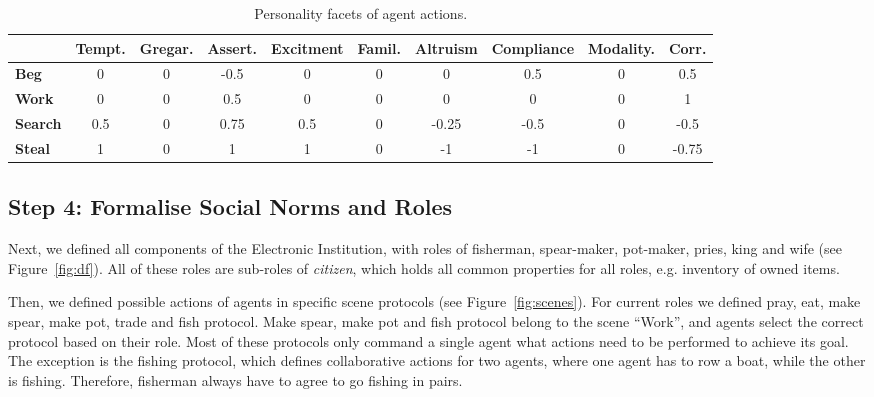 \begin{table}
\caption{Personality facets of agent actions.}
\begin{tabular}{|l|c|c|c|c|c|c|c|c|c|}
\hline

  & \textbf{Tempt.} & \textbf{Gregar.} & \textbf{Assert.} & \textbf{Excitment} & \textbf{Famil.} & \textbf{Altruism} & \textbf{Compliance} & \textbf{Modality.} & \textbf{Corr.} \\ \hline
\textbf{Beg} & 0 & 0 & -0.5 & 0 & 0 & 0 & 0.5 & 0 & 0.5 \\ \hline
\textbf{Work} & 0 & 0 & 0.5 & 0 & 0 & 0 & 0 & 0 & 1 \\ \hline
\textbf{Search} & 0.5 & 0 & 0.75 & 0.5 & 0 & -0.25 & -0.5 & 0 & -0.5 \\ \hline
\textbf{Steal} & 1 & 0 & 1 & 1 & 0 & -1 & -1 & 0 & -0.75 \\ \hline
\end{tabular}
\label{tab:Facets}
\end{table} 


\subsection{Step 4: Formalise Social Norms and Roles}
%

Next, we defined all components of the Electronic Institution, with roles of fisherman, spear-maker, pot-maker, pries, king and wife (see Figure~\ref{fig:df}). All of these roles are sub-roles of \textit{citizen}, which holds all common properties for all roles, e.g. inventory of owned items. 

Then, we defined possible actions of agents in specific scene protocols (see Figure~\ref{fig:scenes}). For current roles we defined pray, eat, make spear, make pot, trade and fish protocol. Make spear, make pot and fish protocol belong to the scene ``Work'', and agents select the correct protocol based on their role. Most of these protocols only command a single agent what actions need to be performed to achieve its goal. The exception is the fishing protocol, which defines collaborative actions for two agents, where one agent has to row a boat, while the other is fishing. Therefore, fisherman always have to agree to go fishing in pairs. 

